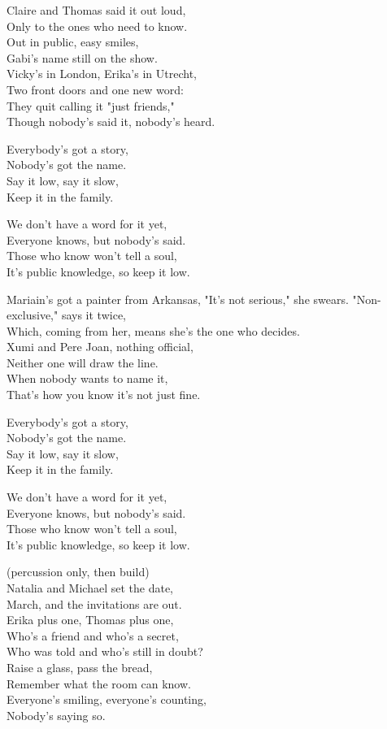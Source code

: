 \begin{lyrics}
Claire and Thomas said it out loud,\\
Only to the ones who need to know.\\
Out in public, easy smiles,\\
Gabi's name still on the show.\\
Vicky's in London, Erika's in Utrecht,\\
Two front doors and one new word:\\
They quit calling it "just friends,"\\
Though nobody's said it, nobody's heard.

Everybody's got a story,\\
Nobody's got the name.\\
Say it low, say it slow,\\
Keep it in the family.

We don't have a word for it yet,\\
Everyone knows, but nobody's said.\\
Those who know won't tell a soul,\\
It's public knowledge, so keep it low.

Mariain's got a painter from Arkansas,
"It's not serious," she swears.
"Non-exclusive," says it twice,\\
Which, coming from her, means she's the one who decides.\\
Xumi and Pere Joan, nothing official,\\
Neither one will draw the line.\\
When nobody wants to name it,\\
That's how you know it's not just fine.

Everybody's got a story,\\
Nobody's got the name.\\
Say it low, say it slow,\\
Keep it in the family.

We don't have a word for it yet,\\
Everyone knows, but nobody's said.\\
Those who know won't tell a soul,\\
It's public knowledge, so keep it low.

 (percussion only, then build)\\
Natalia and Michael set the date,\\
March, and the invitations are out.\\
Erika plus one, Thomas plus one,\\
Who's a friend and who's a secret,\\
Who was told and who's still in doubt?\\
Raise a glass, pass the bread,\\
Remember what the room can know.\\
Everyone's smiling, everyone's counting,\\
Nobody's saying so.


\end{lyrics}
